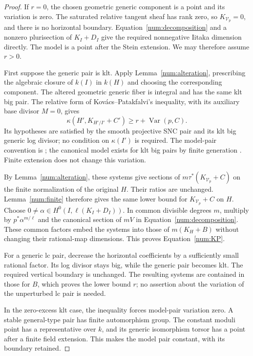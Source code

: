 \begin{proof}
If $r=0$, the chosen geometric generic component is a point and its
variation is zero. The saturated relative tangent sheaf has rank zero,
so $K_{\mathcal V_p}=0$, and there is no horizontal boundary.
Equation~\eqref{num:decomposition} and a nonzero plurisection of
$K_I+D_I$ give the required nonnegative Iitaka dimension directly.
The model is a point after the Stein extension. We may therefore
assume $r>0$.

First suppose the generic pair is klt. Apply
Lemma~\ref{num:alteration}, prescribing the algebraic closure of
$k(I)$ in $k(H)$ and choosing the corresponding component. The altered
geometric generic fiber is integral and has the same klt big pair.
The relative form of Kov\'acs--Patakfalvi's inequality,
\cite[Theorem~9.9]{KovacsPatakfalvi} with its auxiliary base divisor
$M=0$, gives
\[
 \kappa(H',K_{H'/I'}+C')\geq r+\operatorname{Var}(p,C).
\]
Its hypotheses are satisfied by the smooth projective SNC pair and
its klt big generic log divisor; no condition on $\kappa(I')$ is
required. The model-pair convention is
\cite[Definition~6.16, Remark~6.17, Corollary~6.20,
Definition~9.3 and Remark~9.4]{KovacsPatakfalvi}; the
canonical model exists for klt big pairs by finite generation
\cite{BCHM}. Finite extension does not change this variation.

By Lemma~\ref{num:alteration}, these systems give sections of
$m\tau^*(K_{\mathcal V_p}+C)$ on the finite normalization of the
original $H$. Their ratios are unchanged. Lemma~\ref{num:finite}
therefore gives the same lower bound for $K_{\mathcal V_p}+C$ on $H$.
Choose $0\ne\alpha\in H^0(I,\ell(K_I+D_I))$. In common divisible
degrees $m$, multiply by $p^*\alpha^{m/\ell}$ and the canonical
section of $mV$ in Equation~\eqref{num:decomposition}. These common
factors embed the systems into those of $m(K_H+B)$ without changing
their rational-map dimensions. This proves Equation~\eqref{num:KP}.

For a generic lc pair, decrease the horizontal coefficients by a
sufficiently small rational factor. Its log divisor stays big, while
the generic pair becomes klt. The required vertical boundary is
unchanged. The resulting systems are contained in those for $B$, which
proves the lower bound $r$; no assertion about the variation of the
unperturbed lc pair is needed.

In the zero-excess klt case, the inequality forces model-pair variation
zero. A stable general-type pair has finite automorphism group. The
constant moduli point has a representative over $k$, and its generic
isomorphism torsor has a point after a finite field extension. This
makes the model pair constant, with its boundary retained.
\end{proof}

